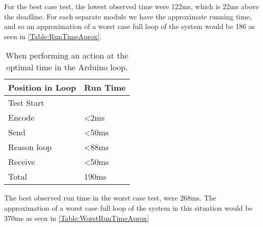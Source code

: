 For the best case test, the lowest observed time were 122ms, which is 22ms above the deadline. For each separate module we have the approximate running time, and so an approximation of a worst case full loop of the system would be 186 as seen in \cref{Table:RunTimeAprox}.
\begin{center}
	\begin{table}[htbp]
	  \centering
	  \begin{tabular}{l l}
		\toprule
		Position in Loop		& Run Time  \\ \midrule
		Test Start		        &           \\ \midrule
		Encode 			        & <2ms  	\\ \midrule
		Send   			        & <50ms     \\ \midrule
		Reason loop 	        & <88ms     \\ \midrule
		Receive 		        & <50ms     \\ \midrule
		Total			        & 190ms	    \\
                                            \bottomrule
	  \end{tabular}
	  \caption[An approximation of a worst case run time of each separate module]{When performing an action at the optimal time in the Arduino loop.}
	\end{table}
 \label{Table:RunTimeAprox}
\end{center}
The best observed run time in the worst case test, were 268ms. The approximation of a worst case full loop of the system in this situation would be 370ms as seen in \cref{Table:WorstRunTimeAprox}

